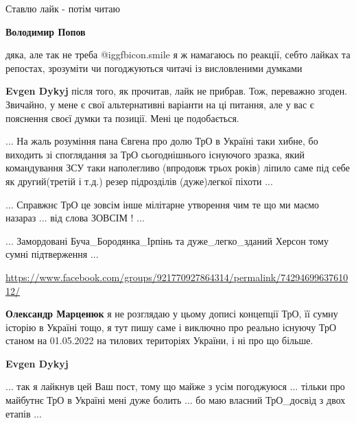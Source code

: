  
 
 
 
 
\zzSecCmt

\begin{itemize} %
Ставлю лайк - потім читаю

\begin{itemize} %
\textbf{Володимир Попов} 

дяка, але так не треба  @igg{fbicon.smile}  я ж намагаюсь по реакції, себто лайках та репостах,
зрозуміти чи погоджуються читачі із висловленими думками

\textbf{Evgen Dykyj} після того, як прочитав, лайк не прибрав. Тож, переважно згоден. Звичайно, у мене є свої альтернативні варіанти на ці питання, але у вас є пояснення своєї думки та позиції. Мені це подобається.
\end{itemize} %


... На жаль розуміння пана Євгена про долю ТрО в Україні таки хибне, бо
виходить зі споглядання за ТрО сьогоднішнього існуючого зразка, який
командування ЗСУ таки наполегливо (впродовж трьох років) ліпило саме під себе
як другий(третій і т.д.) резер підрозділів (дуже)легкої піхоти ...

... Справжнє ТрО це зовсім інше мілітарне утворення чим те що ми маємо назараз
... від слова ЗОВСІМ ! ...

... Замордовані Буча\_Бородянка\_Ірпінь та дуже\_легко\_зданий Херсон тому сумні підтверження ...

\begin{itemize} %
\url{https://www.facebook.com/groups/921770927864314/permalink/7429469963761012/}

\textbf{Олександр Марценюк} я не розглядаю у цьому дописі концепції ТрО, її сумну історію в Україні тощо, я тут пишу саме і виключно про реально існуючу ТрО станом на 01.05.2022 на тилових територіях України, і ні про що більше.

\textbf{Evgen Dykyj} 

... так я лайкнув цей Ваш пост, тому що майже з усім погоджуюся ... тільки про
майбутнє ТрО в Україні мені дуже болить ... бо маю власний ТрО\_досвід з двох
етапів ...


\end{itemize}
\end{itemize}
